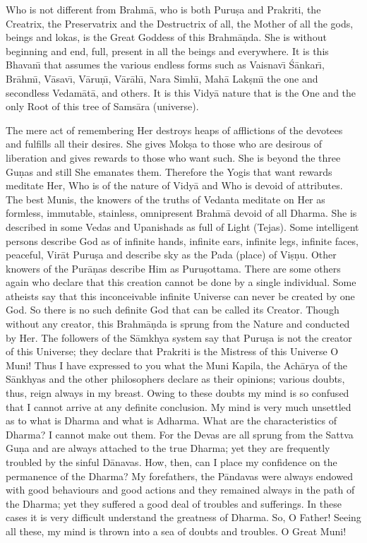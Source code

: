 Who is not different from Brahm\=a, who is both Puru\d{s}a and Prakriti, the Creatrix, the Preservatrix and the Destructrix of all, the Mother of all the gods, beings and lokas, is the Great Goddess of this Brahm\=a\d{n}da. She is without beginning and end, full, present in all the beings and everywhere. It is this Bhavan\={\i} that assumes the various endless forms such as Vaisnav\={\i} \'S\=ankar\={\i}, Br\=ahm\={\i}, V\=asav\={\i}, V\=aru\d{n}\={\i}, V\=ar\=ah\={\i}, Nara Simh\={\i}, Mah\=a Lak\d{s}m\={\i} the one and secondless Vedam\=at\=a, and others. It is this Vidy\=a nature that is the One and the only Root of this tree of Sams\=ara (universe).

The mere act of remembering Her destroys heaps of afflictions of the devotees and fulfills all their desires. She gives Mok\d{s}a to those who are desirous of liberation and gives rewards to those who want such. She is beyond the three Gu\d{n}as and still She emanates them. Therefore the Yogis that want rewards meditate Her, Who is of the nature of Vidy\=a and Who is devoid of attributes. The best Munis, the knowers of the truths of Vedanta meditate on Her as formless, immutable, stainless, omnipresent Brahm\=a devoid of all Dharma. She is described in some Vedas and Upanishads as full of Light (Tejas). Some intelligent persons describe God as of infinite hands, infinite ears, infinite legs, infinite faces, peaceful, Vir\=at Puru\d{s}a and describe sky as the Pada (place) of Vi\d{s}\d{n}u. Other knowers of the Pur\=a\d{n}as describe Him as Puru\d{s}ottama. There are some others again who declare that this creation cannot be done by a single individual. Some atheists say that this inconceivable infinite Universe can never be created by one God. So there is no such definite God that can be called its Creator. Though without any creator, this Brahm\=a\d{n}da is sprung from the Nature and conducted by Her. The followers of the S\=amkhya system say that Puru\d{s}a is not the creator of this Universe; they declare that Prakriti is the Mistress of this Universe O Muni! Thus I have expressed to you what the Muni Kapila, the Ach\=arya of the S\=ankhyas and the other philosophers declare as their opinions; various doubts, thus, reign always in my breast. Owing to these doubts my mind is so confused that I cannot arrive at any definite conclusion. My mind is very much unsettled as to what is Dharma and what is Adharma. What are the characteristics of Dharma? I cannot make out them. For the Devas are all sprung from the Sattva Gu\d{n}a and are always attached to the true Dharma; yet they are frequently troubled by the sinful D\=anavas. How, then, can I place my confidence on the permanence of the Dharma? My forefathers, the P\=andavas were always endowed with good behaviours and good actions and they remained always in the path of the Dharma; yet they suffered a good deal of troubles and sufferings. In these cases it is very difficult understand the greatness of Dharma. So, O Father! Seeing all these, my mind is thrown into a sea of doubts and troubles. O Great Muni!

